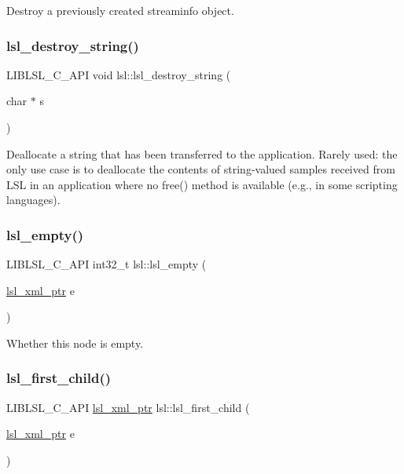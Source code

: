 Destroy a previously created streaminfo object. \mbox{\label{namespacelsl_ac517533eaabb224fd2f893e1f4274d82}} 
\subsubsection{\texorpdfstring{lsl\+\_\+destroy\+\_\+string()}{lsl\_destroy\_string()}}
{\footnotesize\ttfamily L\+I\+B\+L\+S\+L\+\_\+\+C\+\_\+\+A\+PI void lsl\+::lsl\+\_\+destroy\+\_\+string (\begin{DoxyParamCaption}\item[{char $\ast$}]{s }\end{DoxyParamCaption})}

Deallocate a string that has been transferred to the application. Rarely used\+: the only use case is to deallocate the contents of string-\/valued samples received from L\+SL in an application where no free() method is available (e.\+g., in some scripting languages). \mbox{\label{namespacelsl_aa8e3affdd320f70d77b87262d508ba58}} 
\subsubsection{\texorpdfstring{lsl\+\_\+empty()}{lsl\_empty()}}
{\footnotesize\ttfamily L\+I\+B\+L\+S\+L\+\_\+\+C\+\_\+\+A\+PI int32\+\_\+t lsl\+::lsl\+\_\+empty (\begin{DoxyParamCaption}\item[{\hyperlink{namespacelsl_a5edc7a49a1a1be1634fe6dce3d59c59b}{lsl\+\_\+xml\+\_\+ptr}}]{e }\end{DoxyParamCaption})}

Whether this node is empty. \mbox{\label{namespacelsl_a00b272ef8da2c1f1a6ea440219728c32}} 
\subsubsection{\texorpdfstring{lsl\+\_\+first\+\_\+child()}{lsl\_first\_child()}}
{\footnotesize\ttfamily L\+I\+B\+L\+S\+L\+\_\+\+C\+\_\+\+A\+PI \hyperlink{namespacelsl_a5edc7a49a1a1be1634fe6dce3d59c59b}{lsl\+\_\+xml\+\_\+ptr} lsl\+::lsl\+\_\+first\+\_\+child (\begin{DoxyParamCaption}\item[{\hyperlink{namespacelsl_a5edc7a49a1a1be1634fe6dce3d59c59b}{lsl\+\_\+xml\+\_\+ptr}}]{e }\end{DoxyParamCaption})}

